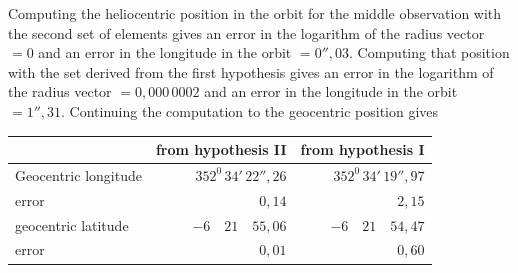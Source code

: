 Computing the heliocentric position in the orbit for the middle observation with the second set of elements gives an error in the logarithm of the radius vector $=0$ and an error in the longitude in the orbit $=0''{,}03$. Computing that position with the set derived from the first hypothesis gives an error in the logarithm of the radius vector $=0{,}000\,0002$ and an error in the longitude in the orbit $=1''{,}31$. Continuing the computation to the geocentric position gives
\begin{center}
\begingroup\small\setlength{\tabcolsep}{4pt}\renewcommand{\arraystretch}{1.2}
\begin{tabular}{|l|r|r|}\hline
& from hypothesis II & from hypothesis I\\\hline
Geocentric longitude & $352^{0}\,34'\,22''{,}26$ & $352^{0}\,34'\,19''{,}97$\\
error & $0{,}14$ & $2{,}15$\\
geocentric latitude & $-6\quad21\quad55{,}06$ & $-6\quad21\quad54{,}47$\\
error & $0{,}01$ & $0{,}60$\\\hline
\end{tabular}\endgroup
\end{center}
